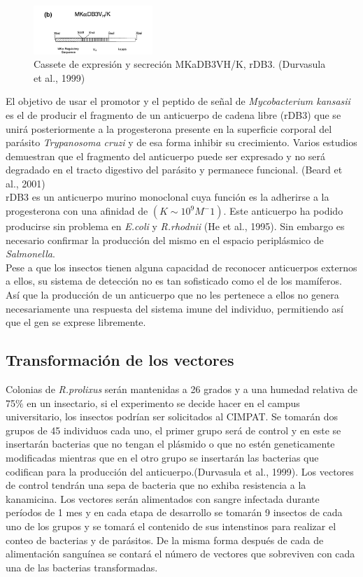 \documentclass[12pt]{article}
\numberwithin{equation}{section}
\begin{document}
\begin{figure}[!ht]
\includegraphics[width=0.4\textwidth]{cassete.PNG}
\caption{Cassete de expresión y secreción MKaDB3VH/K, rDB3. (Durvasula et al., 1999)}
\FloatBarrier
\end{figure}

El objetivo de usar el promotor y el peptido de señal de \textit{Mycobacterium kansasii} es el de producir el fragmento de un anticuerpo de cadena libre (rDB3) que se unirá posteriormente a la progesterona presente en la superficie corporal del parásito \textit{Trypanosoma cruzi} y de esa forma inhibir su crecimiento. Varios estudios demuestran que el fragmento del anticuerpo puede ser expresado y no será degradado en el tracto digestivo del parásito y permanece funcional. (Beard et al., 2001)\\
rDB3 es un anticuerpo murino monoclonal cuya función es la adherirse a la progesterona con una afinidad de $(K\sim 10^9 M^-1)$. Este anticuerpo ha podido producirse sin problema en \textit{E.coli} y \textit{R.rhodnii} (He et al., 1995). Sin embargo es necesario confirmar la producción del mismo en el espacio periplásmico de \textit{Salmonella}.\\
Pese a que los insectos tienen alguna capacidad de reconocer anticuerpos externos a ellos, su sistema de detección no es tan sofisticado como el de los mamíferos. Así que la producción de un anticuerpo que no les pertenece a ellos no genera necesariamente una respuesta del sistema imune del individuo, permitiendo así que el gen se exprese libremente.\\


\subsection{Transformación de los vectores}
Colonias de \textit{R.prolixus} serán mantenidas a 26 grados y a una humedad relativa de 75$\%$ en un insectario, si el experimento se decide hacer en el campus universitario, los insectos podrían ser solicitados al CIMPAT. Se tomarán dos grupos de 45 individuos cada uno, el primer grupo será de control y en este se insertarán bacterias que no tengan el plásmido o que no estén geneticamente modificadas mientras que en el otro grupo se insertarán las bacterias que codifican para la producción del anticuerpo.(Durvasula et al., 1999). Los vectores de control tendrán una sepa de bacteria que no exhiba resistencia a la kanamicina. Los vectores serán  alimentados con sangre infectada durante períodos de 1 mes y en cada etapa de desarrollo se tomarán 9 insectos de cada uno de los grupos y se tomará el contenido de sus intenstinos para realizar el conteo de bacterias y de parásitos.
De la misma forma después de cada de alimentación sanguínea se contará el número de vectores que sobreviven con cada una de las bacterias transformadas.
\end{document}
